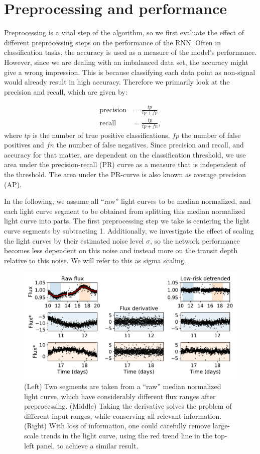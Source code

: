 
\section{Preprocessing and performance}
\label{sec:preprocessing}

Preprocessing is a vital step of the algorithm, so we first evaluate the effect of different preprocessing steps on the performance of the RNN. Often in classification tasks, the accuracy is used as a measure of the model's performance. However, since we are dealing with an imbalanced data set, the accuracy might give a wrong impression. This is because classifying each data point as non-signal would already result in high accuracy. Therefore we primarily look at the precision and recall, which are given by:

\begin{align}
    \text{precision} &= \frac{tp}{tp + fp}\\
    \text{recall} &= \frac{tp}{tp + fn},
\end{align}
where $tp$ is the number of true positive classifications, $fp$ the number of false positives and $fn$ the number of false negatives. Since precision and recall, and accuracy for that matter, are dependent on the classification threshold, we use area under the precision-recall (PR) curve as a measure that is independent of the threshold. The area under the PR-curve is also known as average precision (AP).

In the following, we assume all ``raw'' light curves to be median normalized, and each light curve segment to be obtained from splitting this median normalized light curve into parts. The first preprocessing step we take is centering the light curve segments by subtracting 1.  Additionally, we investigate the effect of scaling the light curves by their estimated noise level $\sigma$, so the network performance becomes less dependent on this noise and instead more on the transit depth relative to this noise. We will refer to this as sigma scaling.

\begin{figure}
    \centering
    \includegraphics[width=0.7\linewidth]{Experiments/Figures/Preprocessing/input-range-example.pdf}
    \caption{(Left) Two segments are taken from a ``raw'' median normalized light curve, which have considerably different flux ranges after preprocessing. (Middle) Taking the derivative solves the problem of different input ranges, while conserving all relevant information. (Right) With loss of information, one could carefully remove large-scale trends in the light curve, using the red trend line in the top-left panel, to achieve a similar result.}
    \label{fig:input_ranges}
\end{figure}

